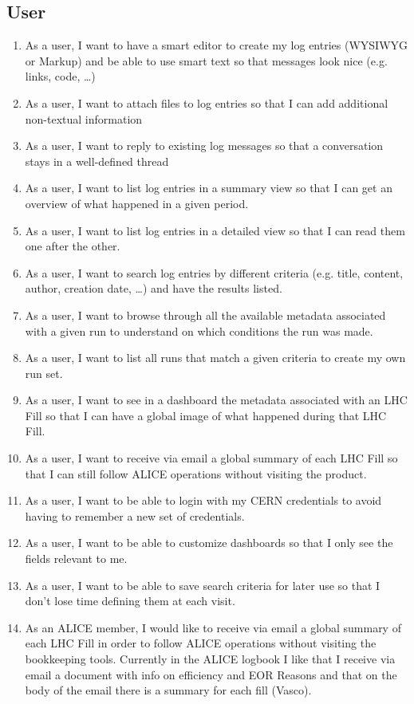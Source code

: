 \subsection{User}
\begin{enumerate}
  \item As a user, I want to have a smart editor to create my log entries (WYSIWYG or Markup) and be able to use smart text so that messages look nice (e.g. links, code, …) 
  \item As a user, I want to attach files to log entries so that I can add additional non-textual information
  \item As a user, I want to reply to existing log messages so that a conversation stays in a well-defined thread
  \item As a user, I want to list log entries in a summary view so that I can get an overview of what happened in a given period.
  \item As a user, I want to list log entries in a detailed view so that I can read them one after the other.
  \item As a user, I want to search log entries by different criteria (e.g. title, content, author, creation date, …) and have the results listed. 
  \item As a user, I want to browse through all the available metadata associated with a given run to understand on which conditions the run was made. 
  \item As a user, I want to list all runs that match a given criteria to create my own run set. 
  \item As a user, I want to see in a dashboard the metadata associated with an LHC Fill so that I can have a global image of what happened during that LHC Fill. 
  \item As a user, I want to receive via email a global summary of each LHC Fill so that I can still follow ALICE operations without visiting the product. 
  \item As a user, I want to be able to login with my CERN credentials to avoid having to remember a new set of credentials. 
  \item As a user, I want to be able to customize dashboards so that I only see the fields relevant to me. 
  \item As a user, I want to be able to save search criteria for later use so that I don’t lose time defining them at each visit. 
  \item As an ALICE member, I would like to receive via email a global summary of each LHC Fill in order to follow ALICE operations without visiting the bookkeeping tools. Currently in the ALICE logbook I like that I receive via email a document with info on efficiency and EOR Reasons and that on the body of the email there is a summary for each fill (Vasco).

\end{enumerate}
